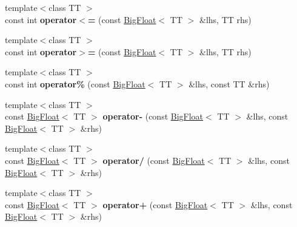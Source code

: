 \begin{DoxyCompactItemize}
\item 
\hypertarget{classatl_1_1_big_float_ae2a41ead513bdd55f09ddba509b9fa61}{{\footnotesize template$<$class T\+T $>$ }\\const int {\bfseries operator$<$=} (const \hyperlink{classatl_1_1_big_float}{Big\+Float}$<$ T\+T $>$ \&lhs, T\+T rhs)}\label{classatl_1_1_big_float_ae2a41ead513bdd55f09ddba509b9fa61}

\item 
\hypertarget{classatl_1_1_big_float_a98a658735f09ccd408e84d1000b2c33e}{{\footnotesize template$<$class T\+T $>$ }\\const int {\bfseries operator$>$=} (const \hyperlink{classatl_1_1_big_float}{Big\+Float}$<$ T\+T $>$ \&lhs, T\+T rhs)}\label{classatl_1_1_big_float_a98a658735f09ccd408e84d1000b2c33e}

\item 
\hypertarget{classatl_1_1_big_float_a8d360aba013d2622d6c6fa2387b63e3f}{{\footnotesize template$<$class T\+T $>$ }\\const int {\bfseries operator\%} (const \hyperlink{classatl_1_1_big_float}{Big\+Float}$<$ T\+T $>$ \&lhs, const T\+T \&rhs)}\label{classatl_1_1_big_float_a8d360aba013d2622d6c6fa2387b63e3f}

\item 
\hypertarget{classatl_1_1_big_float_afe44c21d7e8612033b8f573500da7db7}{{\footnotesize template$<$class T\+T $>$ }\\const \hyperlink{classatl_1_1_big_float}{Big\+Float}$<$ T\+T $>$ {\bfseries operator-\/} (const \hyperlink{classatl_1_1_big_float}{Big\+Float}$<$ T\+T $>$ \&lhs, const \hyperlink{classatl_1_1_big_float}{Big\+Float}$<$ T\+T $>$ \&rhs)}\label{classatl_1_1_big_float_afe44c21d7e8612033b8f573500da7db7}

\item 
\hypertarget{classatl_1_1_big_float_a4f5b15e762cf2d5866f910348bc8123c}{{\footnotesize template$<$class T\+T $>$ }\\const \hyperlink{classatl_1_1_big_float}{Big\+Float}$<$ T\+T $>$ {\bfseries operator/} (const \hyperlink{classatl_1_1_big_float}{Big\+Float}$<$ T\+T $>$ \&lhs, const \hyperlink{classatl_1_1_big_float}{Big\+Float}$<$ T\+T $>$ \&rhs)}\label{classatl_1_1_big_float_a4f5b15e762cf2d5866f910348bc8123c}

\item 
\hypertarget{classatl_1_1_big_float_a4dc815dcac22782a20155550253b96f6}{{\footnotesize template$<$class T\+T $>$ }\\const \hyperlink{classatl_1_1_big_float}{Big\+Float}$<$ T\+T $>$ {\bfseries operator+} (const \hyperlink{classatl_1_1_big_float}{Big\+Float}$<$ T\+T $>$ \&lhs, const \hyperlink{classatl_1_1_big_float}{Big\+Float}$<$ T\+T $>$ \&rhs)}\label{classatl_1_1_big_float_a4dc815dcac22782a20155550253b96f6}


\end{DoxyCompactItemize}
